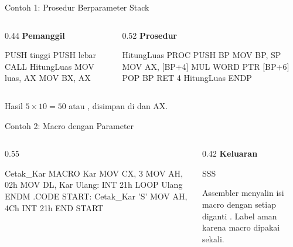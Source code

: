 \documentclass[aspectratio=169,11pt]{beamer}
\begin{document}
\begin{frame}[fragile]{Contoh 1: Prosedur Berparameter Stack}
\begin{columns}[t]
\begin{column}{0.44\textwidth}
{\color{obeTeal}\bfseries Pemanggil}\\[0.15em]
\begin{kodeasm}[numbers=none]
PUSH tinggi
PUSH lebar
CALL HitungLuas
MOV luas, AX
MOV BX, AX
\end{kodeasm}
\end{column}
\begin{column}{0.52\textwidth}
{\color{obeTeal}\bfseries Prosedur}\\[0.15em]
\begin{kodeasm}[numbers=none]
HitungLuas PROC
    PUSH BP
    MOV BP, SP
    MOV AX, [BP+4]
    MUL WORD PTR [BP+6]
    POP BP
    RET 4
HitungLuas ENDP
\end{kodeasm}
\end{column}
\end{columns}

\vspace{0.2em}
{\footnotesize\color{obeGray}Hasil $5 \times 10 = 50$ atau
, disimpan di  dan AX.\par}
\end{frame}

\begin{frame}[fragile]{Contoh 2: Macro dengan Parameter}
\begin{columns}[t]
\begin{column}{0.55\textwidth}
\begin{kodeasm}
Cetak_Kar MACRO Kar
    MOV CX, 3
    MOV AH, 02h
    MOV DL, Kar
Ulang:
    INT 21h
    LOOP Ulang
ENDM
.CODE
START:
    Cetak_Kar 'S'
    MOV AH, 4Ch
    INT 21h
END START
\end{kodeasm}
\end{column}
\begin{column}{0.42\textwidth}
\footnotesize
{\color{obeTeal}\bfseries Keluaran}\\[0.15em]
\begin{keluaran}
SSS
\end{keluaran}

\vspace{0.3em}
Assembler menyalin isi macro dengan setiap  diganti
. Label  aman karena macro dipakai sekali.
\end{column}
\end{columns}
\end{frame}
\end{document}

